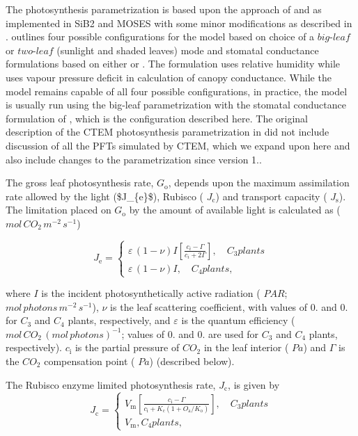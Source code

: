 The photosynthesis parametrization is based upon the approach of \cite{Farquhar1980-96e} and \cite{Collatz1991-5bc} \cite{Collatz1992-jf} as implemented in Si\+B2 \cite{Sellers1996-bh} and M\+O\+S\+E\+S \cite{Cox1999-ia} with some minor modifications as described in \cite{Arora2003-3b7}. \cite{Arora2003-3b7} outlines four possible configurations for the model based on choice of a $\textit{big-leaf}$ or $\textit{two-leaf}$ (sunlight and shaded leaves) mode and stomatal conductance formulations based on either \cite{Ball1987-ou} or \cite{Leuning1995-ab}. The \cite{Ball1987-ou} formulation uses relative humidity while \cite{Leuning1995-ab} uses vapour pressure deficit in calculation of canopy conductance. While the model remains capable of all four possible configurations, in practice, the model is usually run using the big-\/leaf parametrization with the stomatal conductance formulation of \cite{Leuning1995-ab}, which is the configuration described here. The original description of the C\+T\+E\+M photosynthesis parametrization in \cite{Arora2003-3b7} did not include discussion of all the P\+F\+Ts simulated by C\+T\+E\+M, which we expand upon here and also include changes to the parametrization since version 1..

The gross leaf photosynthesis rate, $G_\mathrm{o}$, depends upon the maximum assimilation rate allowed by the light (\$\+J\+\_\+\{e\}\$), Rubisco ( $J_\mathrm{c}$) and transport capacity ( $J_\mathrm{s}$). The limitation placed on $G_\mathrm{o}$ by the amount of available light is calculated as ( $mol\,CO_2\,m^{-2}\,s^{-1}$)

\[ \label{J_e} J_\mathrm{e} = \begin{cases} \varepsilon\,(1-{\nu})I \left[\frac{c_{i} - \Gamma}{c_{i} + 2\Gamma}\right], \quad C_3 plants\\ \varepsilon\,(1-{\nu})I,\quad C_4 plants, \end{cases} \]

where $I$ is the incident photosynthetically active radiation ( $PAR$; $mol\,photons\,m^{-2}\,s^{-1}$), ${\nu}$ is the leaf scattering coefficient, with values of 0. and 0. for $C_3$ and $C_4$ plants, respectively, and $\varepsilon$ is the quantum efficiency ( $mol\,{CO_2}\,(mol\,photons)^{-1}$; values of 0. and 0. are used for $C_3$ and $C_4$ plants, respectively). $c_\mathrm{i}$ is the partial pressure of $CO_2$ in the leaf interior ( $Pa$) and $\Gamma$ is the $CO_2$ compensation point ( $Pa$) (described below).

The Rubisco enzyme limited photosynthesis rate, $J_\mathrm{c}$, is given by \[ \label{J_c} J_\mathrm{c} = \begin{cases} V_\mathrm{m} \left[\frac{c_\mathrm{i} - \Gamma}{c_\mathrm{i} + K_\mathrm{c}(1 + O_\mathrm{a}/K_\mathrm{o})}\right],\quad C_3 plants\\ V_\mathrm{m}, C_4 plants, \end{cases} \]

